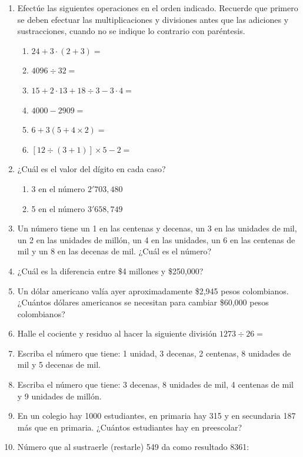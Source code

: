 \documentclass[letterpaper,fleqn]{article}
\newcommand{\LineaNombre}{%
\par
\vspace{\baselineskip}
Nombre:\hrulefill \; Curso: \underline{\hspace*{48pt}} \; Fecha: \underline{\hspace*{2.5cm}} \relax
\par}
\begin{document}
\begin{enumerate}
\item Efectúe las siguientes operaciones en el orden indicado. Recuerde que primero se deben efectuar las multiplicaciones y divisiones antes que las adiciones y sustracciones, cuando no se indique lo contrario con paréntesis.
\begin{enumerate}
\item $24+3\cdot (2+3)=$
\item $4096\div 32=$ 
\item $15+2\cdot 13+18\div 3-3\cdot 4=$ 
\item $4000-2909=$
\item $6+3(5+4\times 2)=$
\item $[12\div (3+1)]\times 5-2=$
\end{enumerate}
 \item ¿Cuál es el valor del dígito en cada caso?
 \begin{enumerate}
 \item 3 en el número $2'703,480$ 
 \item 5 en el número $3'658,749$ 
 \end{enumerate}
 \item Un número tiene un 1 en las centenas y decenas, un 3 en las unidades de mil, un 2 en las unidades de millón, un 4 en las unidades, un 6 en las centenas de mil y un 8 en las decenas de mil. ¿Cuál es el número?
 \item ¿Cuál es la diferencia entre \$4 millones y \$250,000? 
 \item Un dólar americano valía ayer aproximadamente \$2,945 pesos colombianos. ¿Cuántos dólares americanos se necesitan para cambiar \$60,000 pesos colombianos?
 \item Halle el cociente y residuo al hacer la siguiente división \;
 $1273\div 26=$
  \item Escriba el número que tiene: 1 unidad, 3 decenas, 2 centenas, 8 unidades de mil y 5 decenas de mil.
 \item Escriba el número que tiene: 3 decenas, 8 unidades de mil, 4 centenas de mil y 9 unidades de millón.
 \item En un colegio hay 1000 estudiantes, en primaria hay 315 y en secundaria 187 más que en primaria. ¿Cuántos estudiantes hay en preescolar?
 \item Número que al sustraerle (restarle) 549 da como resultado 8361:
 \end{enumerate}
\end{document}

